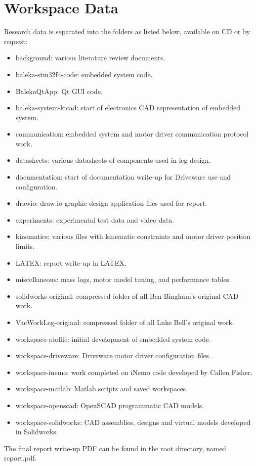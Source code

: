 \chapter{Workspace Data}

Research data is separated into the folders as listed below, available on CD or by request:

\begin{itemize}
\item background: various literature review documents.
\item baleka-stm32f4-code: embedded system code.
\item BalekaQtApp: Qt GUI code.
\item baleka-system-kicad: start of electronics CAD representation of embedded system.
\item communication: embedded system and motor driver communication protocol work.
\item datasheets: various datasheets of components used in leg design.
\item documentation: start of documentation write-up for Driveware use and configuration.
\item drawio: draw.io graphic design application files used for report.
\item experiments: experimental test data and video data.
\item kinematics: various files with kinematic constraints and motor driver position limits.
\item LATEX: report write-up in LATEX.
\item miscellaneous: mass logs, motor model tuning, and performance tables.
\item solidworks-original: compressed folder of all Ben Bingham's original CAD work.
\item VacWorkLeg-original: compressed folder of all Luke Bell's original work.
\item workspace-atollic: initial development of embedded system code.
\item workspace-driveware: Driveware motor driver configuration files.
\item workspace-inemo: work completed on iNemo code developed by Callen Fisher.
\item workspace-matlab: Matlab scripts and saved workspaces.
\item workspace-openscad: OpenSCAD programmatic CAD models.
\item workspace-solidworks: CAD assemblies, designs and virtual models developed in Solidworks.
\end{itemize}

The final report write-up PDF can be found in the root directory, named report.pdf.